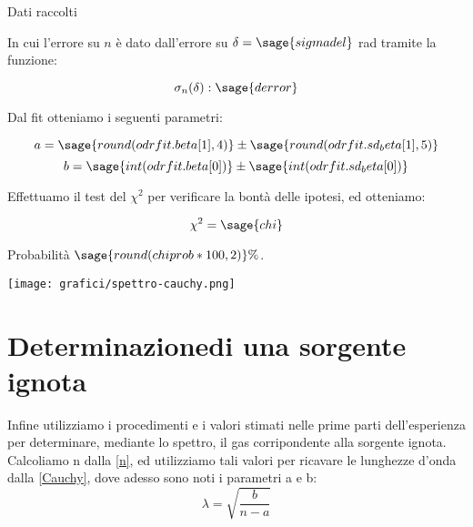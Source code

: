 Dati raccolti

\begin{center}
\end{center}

In cui l'errore su $n$ è dato dall'errore su $\delta = \sage{sigmadel}$ rad tramite la funzione:

$$\sigma_n(\delta): \sage{derror}$$

Dal fit otteniamo i seguenti parametri:

$$a = \sage{round(odrfit.beta[1],4)} \pm \sage{round(odrfit.sd_beta[1],5)}$$
$$b = \sage{int(odrfit.beta[0])} \pm \sage{int(odrfit.sd_beta[0])}$$

Effettuamo il test del ${\chi}^2$ per verificare la bontà delle ipotesi, ed otteniamo:

$$ \chi^ 2 = \sage{chi}$$

Probabilità $\sage{round(chiprob*100, 2)}\%$.

\begin{center}
\texttt{[image: grafici/spettro-cauchy.png]}
\end{center}




\section*{Determinazionedi una sorgente ignota}
Infine utilizziamo i procedimenti e i valori stimati nelle prime parti dell'esperienza  per determinare, mediante lo spettro, il gas corripondente alla sorgente ignota.\\

Calcoliamo n dalla \ref{n}, ed utilizziamo tali valori per ricavare le lunghezze d'onda dalla \ref{Cauchy}, dove adesso sono noti i parametri a e b:
\begin{equation}
\lambda = \sqrt{\frac{b}{n-a}}
\end{equation}




